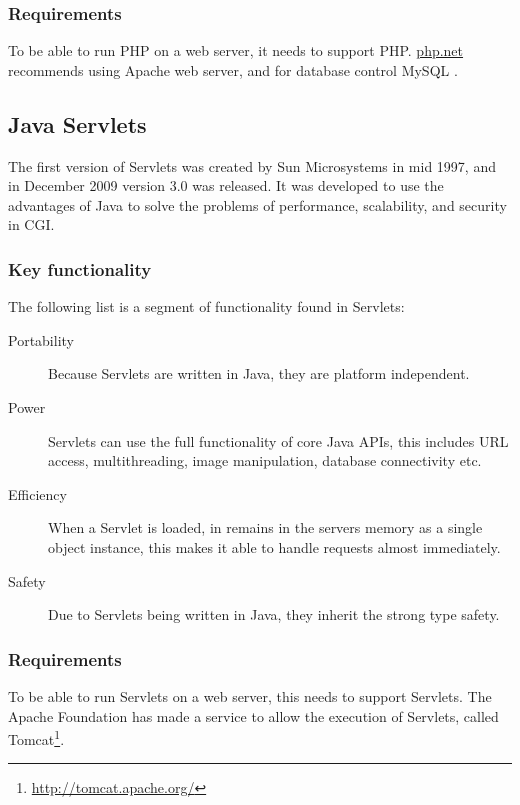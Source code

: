 \subsubsection*{Requirements}

\noindent To be able to run PHP on a web server, it needs to support PHP. \href{http://www.php.net/manual/en/tutorial.requirements.php}{php.net} recommends using Apache web server, and for database control MySQL \cite{phpReq}.

\subsection*{Java Servlets}
The first version of Servlets was created by Sun Microsystems in mid 1997, and in December 2009 version 3.0 was released\cite{servletHistory}. It was developed to use the advantages of Java to solve the problems of performance, scalability, and security in CGI\cite{servletHistory2}.

\subsubsection*{Key functionality}

\noindent The following list is a segment of functionality found in Servlets\cite{servletFunctionality}:

\begin{description}
	\item[Portability] Because Servlets are written in Java, they are platform independent.
	\item[Power] Servlets can use the full functionality of core Java APIs, this includes URL access, multithreading, image manipulation, database connectivity etc.
	\item[Efficiency] When a Servlet is loaded, in remains in the servers memory as a single object instance, this makes it able to handle requests almost immediately.
	\item[Safety] Due to Servlets being written in Java, they inherit the strong type safety.
\end{description}

\subsubsection*{Requirements}

To be able to run Servlets on a web server, this needs to support Servlets. The Apache Foundation has made a service to allow the execution of Servlets, called Tomcat\footnote{\url{http://tomcat.apache.org/}}.


